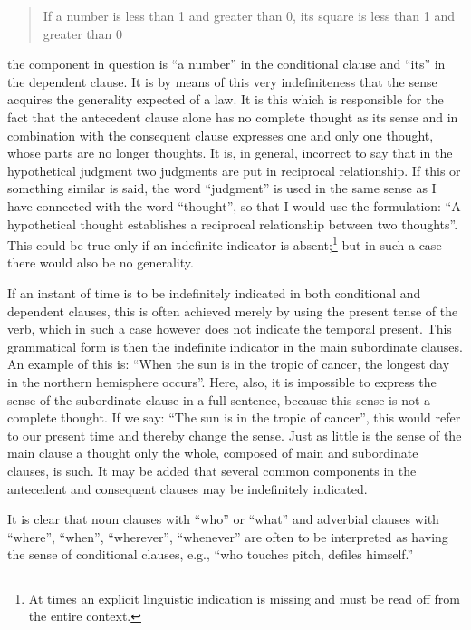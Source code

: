 \documentclass[twoside,12pt]{article}
\begin{document}
\begin{quote}
  If a number is less than 1 and greater than 0, its square is less
  than 1 and greater than 0
\end{quote}

\noindent the component in question is ``a number'' in the conditional
clause and ``its'' in the dependent clause. It is by means of this
very indefiniteness that the sense acquires the generality expected of
a law. It is this which is responsible for the fact that the
antecedent clause alone has no complete thought as its sense and in
combination with the consequent clause expresses one and only one
thought, whose parts are no longer thoughts. It is, in general,
incorrect to say that in the hypothetical judgment two judgments are
put in reciprocal relationship. If this or something similar is said,
the word ``judgment'' is used in the same sense as I have connected
with the word ``thought'', so that I would use the formulation: ``A
hypothetical thought establishes a reciprocal relationship between two
thoughts''. This could be true only if an indefinite indicator is
absent;\footnote[11]{At times an explicit linguistic indication is
  missing and must be read off from the entire context.} but in such a
case there would also be no generality.

If an instant of time is to be indefinitely indicated in both
conditional and dependent clauses, this is often achieved merely by
using the present tense of the verb, which in such a case however does
not indicate the temporal present. This grammatical form is then the
indefinite indicator in the main subordinate clauses. An example of
this is: ``When the sun is in the tropic of cancer, the longest day
in the northern hemisphere occurs''. Here, also, it is impossible to
express the sense of the subordinate clause in a full sentence,
because this sense is not a complete thought. If we say: ``The sun is
in the tropic of cancer'', this would refer to our present time and
thereby change the sense. Just as little is the sense of the main
clause a thought only the whole, composed of main and subordinate
clauses, is such. It may be added that several common components in
the antecedent and consequent clauses may be indefinitely indicated.

It is clear that noun clauses with ``who'' or ``what'' and adverbial
clauses with ``where'', ``when'', ``wherever'', ``whenever'' are often
to be interpreted as having the sense of conditional clauses, e.g.,
``who touches pitch, defiles himself.''
\end{document}
